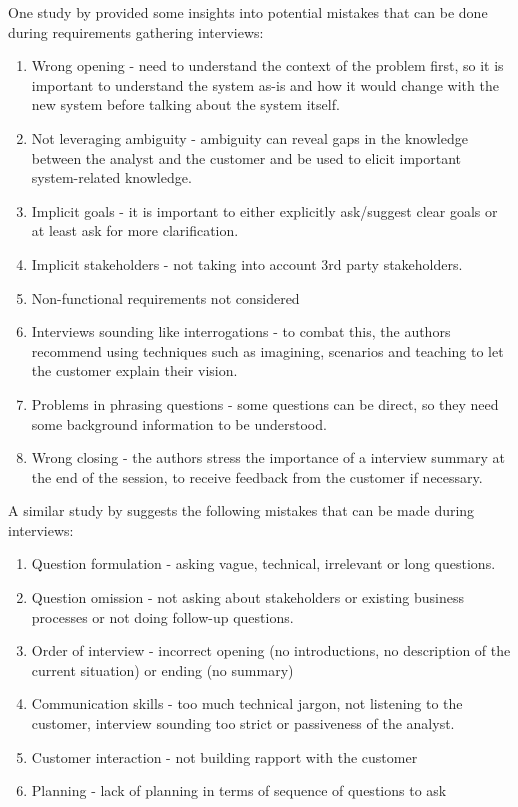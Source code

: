 One study by \textcite{interviews1} provided some insights into potential mistakes that can be done during requirements gathering interviews:
\begin{enumerate}
    \item Wrong opening - need to understand the context of the problem first, so it is important to understand the system as-is and how it would change with the new system before talking about the system itself.
    \item Not leveraging ambiguity - ambiguity can reveal gaps in the knowledge between the analyst and the customer and be used to elicit important system-related knowledge.
    \item Implicit goals - it is important to either explicitly ask/suggest clear goals or at least ask for more clarification.
    \item Implicit stakeholders - not taking into account 3rd party stakeholders.
    \item Non-functional requirements not considered
    \item Interviews sounding like interrogations - to combat this, the authors recommend using techniques such as imagining, scenarios and teaching to let the customer explain their vision.
    \item Problems in phrasing questions - some questions can be direct, so they need some background information to be understood.
    \item Wrong closing - the authors stress the importance of a interview summary at the end of the session, to receive feedback from the customer if necessary.
\end{enumerate}

A similar study by \textcite{interviews2} suggests the following mistakes that can be made during interviews:

\begin{enumerate}
    \item Question formulation - asking vague, technical, irrelevant or long questions.
    \item Question omission - not asking about stakeholders or existing business processes or not doing follow-up questions.
    \item Order of interview - incorrect opening (no introductions, no description of the current situation) or ending (no summary)
    \item Communication skills - too much technical jargon, not listening to the customer, interview sounding too strict or passiveness of the analyst.
    \item Customer interaction - not building rapport with the customer
    \item Planning - lack of planning in terms of sequence of questions to ask
\end{enumerate}

